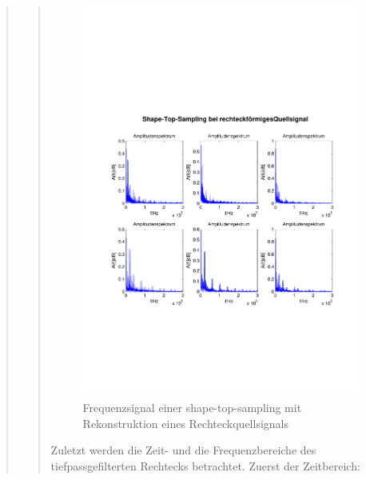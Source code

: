 \begin{quote}
\begin{quote}
        	
        	\begin{figure}[H]
            \centering
            \includegraphics[scale=0.6, trim = 1.5cm 6cm 1cm 8cm,
            clip]{./Bilder/shape-top-recht_freq}
                \caption{Frequenzsignal einer shape-top-sampling mit Rekonstruktion
                eines Rechteckquellsignals}
      	    \end{figure}
      	    
        
        
        	Zuletzt werden die Zeit- und die Frequenzbereiche des tiefpassgefilterten
        	Rechtecks betrachtet. Zuerst der Zeitbereich:
        	

\end{quote}
\end{quote}
